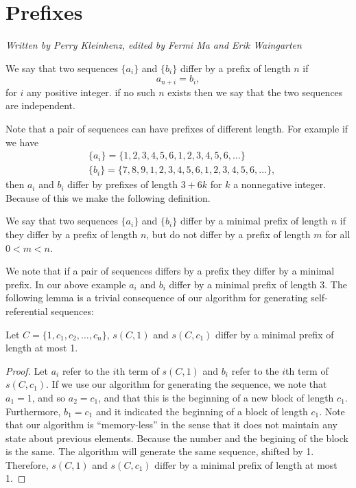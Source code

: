 \documentclass[runningheads,a4paper]{llncs}
\begin{document}
\section{Prefixes}
\label{prefixes}
\emph{Written by Perry Kleinhenz, edited by Fermi Ma and Erik Waingarten}
\begin{definition} We say that two sequences $\{a_i\}$ and $\{b_i\}$ differ by a prefix of length $n$ if 
\begin{equation*}
a_{n+i} = b_{i},
\end{equation*}
for $i$ any positive integer. if no such $n$ exists then we say that the two sequences are independent.
\end{definition}
Note that a pair of sequences can have prefixes of different length. For example if we have 
\begin{align*}
&\{a_i\} = \{1,2,3,4,5,6,1,2,3,4,5,6, \ldots \} \\  
&\{b_i\}= \{7,8,9,1,2,3,4,5,6,1,2,3,4,5,6, \ldots\},
\end{align*}
 then $a_i$ and $b_i$ differ by prefixes of length $3+6k$ for $k$ a nonnegative integer. Because of this we make the following definition.
 \begin{definition} 
 We say that two sequences $\{a_i\}$ and $\{b_i\}$ differ by a minimal prefix of length $n$ if they differ by a prefix of length $n$, but do not differ by a prefix of length $m$ for all $0<m<n$.
 \end{definition}
We note that if a pair of sequences differs by a prefix they differ by a minimal prefix. In our above example $a_i$ and $b_i$ differ by a minimal prefix of length $3$. The following lemma is a trivial consequence of our algorithm for generating self-referential sequences:

\begin{lemma} Let $C = \{1, c_1, c_2, \ldots, c_n\}$, $s(C, 1)$ and $s(C, c_1)$ differ by a minimal prefix of length at most 1.
\end{lemma}
\begin{proof}
Let $a_i$ refer to the $i$th term of $s(C, 1)$ and $b_i$ refer to the $i$th term of $s(C, c_1)$. If we use our algorithm for generating the sequence, we note that $a_1 = 1$, and so $a_2 = c_1$, and that this is the beginning of a new block of length $c_1$. Furthermore, $b_1 = c_1$ and it indicated the beginning of a block of length $c_1$. Note that our algorithm is ``memory-less'' in the sense that it does not maintain any state about previous elements. Because the number and the begining of the block is the same. The algorithm will generate the same sequence, shifted by 1. Therefore, $s(C,1)$ and $s(C, c_1)$ differ by a minimal prefix of length at most 1.
\end{proof}
\end{document}

